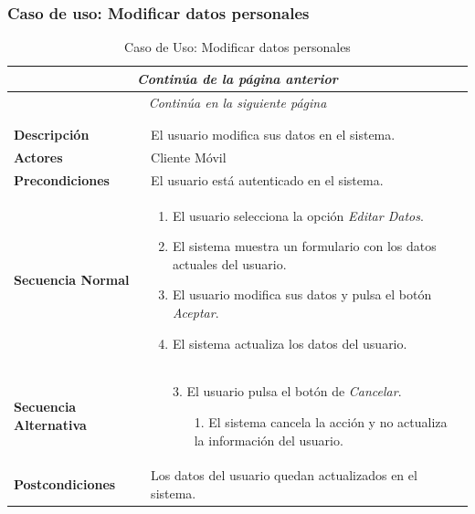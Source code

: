\subsubsection*{Caso de uso: Modificar datos personales }
\begin{longtable}{| p{4cm} | p{10cm} |}
\endfirsthead
\multicolumn{2}{c}{\textit{Continúa de la página anterior}}\\[12pt]
\hline
\endhead
\hline
\multicolumn{2}{c}{\textit{Continúa en la siguiente página}} \\
\endfoot
\hline
\caption{Caso de Uso: Modificar datos personales}\label{fig:1}\\
\endlastfoot


\hline
\multicolumn{2}{|c|}{\textbf{CU$<$21$>$ - Modificar Datos Personales}} \\

\hline
\textbf{Descripción} &
El usuario modifica sus datos en el sistema.\\

\hline
\textbf{Actores} &
Cliente Móvil\\

\hline
\textbf{Precondiciones} &
El usuario está autenticado en el sistema.\\

\hline
\textbf{Secuencia Normal} &\mbox{}\par\vspace{-\baselineskip}
\begin{enumerate}[leftmargin=0.7cm, topsep=0.1cm]
\item El usuario selecciona la opción \textit{Editar Datos}.
\item El sistema muestra un formulario con los datos actuales del usuario.
\item El usuario modifica sus datos y pulsa el botón \textit{Aceptar}.
\item El sistema actualiza los datos del usuario.
\end{enumerate}


\\
\hline
\textbf{Secuencia Alternativa} &\mbox{}\par\vspace{-\baselineskip}
\begin{enumerate}[leftmargin=0.9cm, topsep=0.1cm]
\item[3.] El usuario pulsa el botón de \textit{Cancelar}.
	\begin{itemize}
	\item[1.] El sistema cancela la acción y no actualiza la información del usuario.
	\end{itemize}
\end{enumerate}
\\

\hline
\textbf{Postcondiciones} & 
Los datos del usuario quedan actualizados en el sistema.\\
\hline
\end{longtable}



